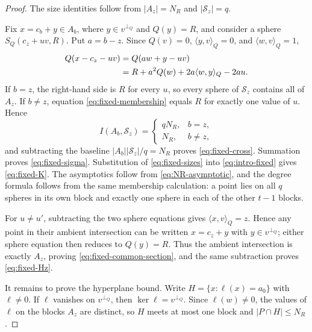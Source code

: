 \documentclass[11pt,letterpaper]{amsart}
\theoremstyle{definition}
\theoremstyle{remark}
\newcommand{\1}{\mathbf 1}
\newcommand{\ip}[2]{\langle #1,#2\rangle_Q}
\begin{document}
\begin{proof}
The size identities follow from $|A_z|=N_R$ and $|\mathcal S_z|=q$.

Fix $x=c_b+y\in A_b$, where $y\in v^{\perp_Q}$ and $Q(y)=R$, and consider a sphere $S_Q(c_z+uv,R)$.  Put $a=b-z$.  Since $Q(v)=0$, $\ip{y}{v}=0$, and $\ip{w}{v}=1$,
\begin{align}
 Q(x-c_z-uv)
 &=Q(aw+y-uv)\notag\\
 &=R+a^2Q(w)+2a\ip{w}{y}-2au.
 \label{eq:fixed-membership}
\end{align}
If $b=z$, the right-hand side is $R$ for every $u$, so every sphere of $\mathcal S_z$ contains all of $A_z$.  If $b\ne z$, equation \eqref{eq:fixed-membership} equals $R$ for exactly one value of $u$.  Hence
\[
 I(A_b,\mathcal S_z)=
 \begin{cases}
 qN_R,&b=z,\\
 N_R,&b\ne z,
 \end{cases}
\]
and subtracting the baseline $|A_b||\mathcal S_z|/q=N_R$ proves \eqref{eq:fixed-cross}.  Summation proves \eqref{eq:fixed-sigma}.  Substitution of \eqref{eq:fixed-sizes} into \eqref{eq:intro-fixed} gives \eqref{eq:fixed-K}.  The asymptotics follow from \eqref{eq:NR-asymptotic}, and the degree formula follows from the same membership calculation: a point lies on all $q$ spheres in its own block and exactly one sphere in each of the other $t-1$ blocks.

For $u\ne u'$, subtracting the two sphere equations gives $\ip{x}{v}=z$.  Hence any point in their ambient intersection can be written $x=c_z+y$ with $y\in v^{\perp_Q}$; either sphere equation then reduces to $Q(y)=R$.  Thus the ambient intersection is exactly $A_z$, proving \eqref{eq:fixed-common-section}, and the same subtraction proves \eqref{eq:fixed-Hz}.

It remains to prove the hyperplane bound.  Write $H=\{x:\ell(x)=a_0\}$ with $\ell\ne0$.  If $\ell$ vanishes on $v^{\perp_Q}$, then $\ker\ell=v^{\perp_Q}$.  Since $\ell(w)\ne0$, the values of $\ell$ on the blocks $A_z$ are distinct, so $H$ meets at most one block and $|P\cap H|\le N_R$.


\end{proof}
\end{document}
